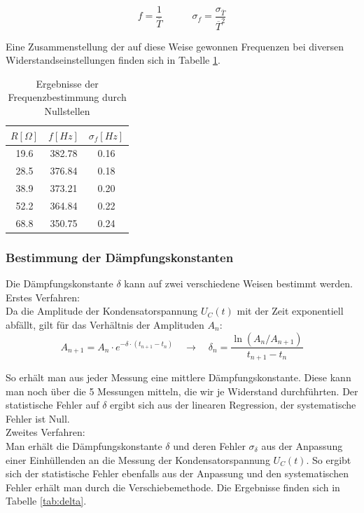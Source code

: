 \documentclass[12pt,a4paper]{article}
\begin{document}
\begin{equation}
f=\frac{1}{\overline{T}} \quad \quad \quad
\sigma_f=\frac{\sigma_{\overline{T}}}{\overline{T}^2}
\end{equation}

Eine Zusammenstellung der auf diese Weise gewonnen Frequenzen bei diversen Widerstandseinstellungen finden sich in Tabelle \ref{tab:Frequenzen}.

\begin{table}
\begin{center}
\begin{tabular}{|c|c|c|}
\hline
$R[\Omega]$ & $f[Hz]$ & $\sigma_f[Hz]$ \\
\hline
 19.6 & 382.78 & 0.16\\
\hline
 28.5 & 376.84 & 0.18\\
\hline
 38.9 & 373.21 & 0.20\\
\hline
 52.2 & 364.84 & 0.22\\
\hline
 68.8 & 350.75 & 0.24\\
\hline
\end{tabular}
\end{center}
\caption{Ergebnisse der Frequenzbestimmung durch Nullstellen}
\label{tab:Frequenzen}
\end{table}



\subsubsection{Bestimmung der Dämpfungskonstanten}
Die Dämpfungskonstante $\delta$ kann auf zwei verschiedene Weisen bestimmt werden.\\

Erstes Verfahren:\\
Da die Amplitude der Kondensatorspannung $U_C(t)$ mit der Zeit exponentiell abfällt, gilt für das Verhältnis der Amplituden $A_n$:
\begin{equation}
A_{n+1} = A_n \cdot e^{-\delta \cdot (t_{n+1} - t_n)} \quad \rightarrow \quad \delta_n = \frac{\ln ( A_n / A_{n+1})}{t_{n+1}-t_n}
\end{equation}

So erhält man aus jeder Messung eine mittlere Dämpfungskonstante. Diese kann man noch über die 5 Messungen mitteln, die wir je Widerstand durchführten. Der statistische Fehler auf $\delta$ ergibt sich aus der linearen Regression, der systematische Fehler ist Null.\\

Zweites Verfahren:\\
Man erhält die Dämpfungskonstante $\delta$ und deren Fehler $\sigma_\delta$ aus der Anpassung einer Einhüllenden an die Messung der Kondensatorspannung $U_C(t)$. So ergibt sich der statistische Fehler ebenfalls aus der Anpassung und den systematischen Fehler erhält man durch die Verschiebemethode.  Die Ergebnisse finden sich in Tabelle \ref{tab:delta}.
\end{document}
